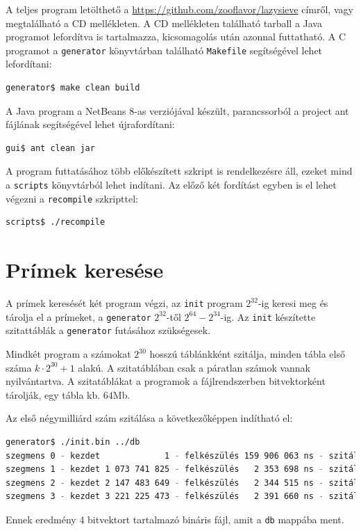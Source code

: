 A teljes program letölthető a \url{https://github.com/zooflavor/lazysieve} címről, vagy megtalálható a CD mellékleten.
A CD mellékleten található tarball a Java programot lefordítva is tartalmazza, kicsomagolás után azonnal futtatható.
A C programot a \texttt{generator} könyvtárban található \texttt{Makefile} segítségével lehet lefordítani:
\begin{lstlisting}[language=bash]
generator$ make clean build
\end{lstlisting}

A Java program a NetBeans 8-as verziójával készült,
parancssorból a project ant fájlának segítségével lehet újrafordítani:
\begin{lstlisting}[language=bash]
gui$ ant clean jar
\end{lstlisting}

A program futtatásához több előkészített szkript is rendelkezésre áll, ezeket mind a \texttt{scripts} könyvtárból lehet indítani.
Az előző két fordítást egyben is el lehet végezni a \texttt{recompile} szkripttel:
\begin{lstlisting}[language=bash]
scripts$ ./recompile
\end{lstlisting}

\section{Prímek keresése}

A prímek keresését két program végzi, az \texttt{init} program $2^{32}$-ig keresi meg és tárolja el a prímeket, a \texttt{generator} $2^{32}$-től $2^{64}-2^{34}$-ig.
Az \texttt{init} készítette szitattáblák a \texttt{generator} futásához szükségesek.

Mindkét program a számokat $2^{30}$ hosszú táblánkként szitálja, minden tábla első száma $k \cdot 2^{30}+1$ alakú.
A szitatáblában csak a páratlan számok vannak nyilvántartva.
A szitatáblákat a programok a fájlrendszerben bitvektorként tárolják, egy tábla kb. $64$Mb.

Az első négymilliárd szám szitálása a következőképpen indítható el:

\begin{lstlisting}[language=bash]
generator$ ./init.bin ../db
szegmens 0 - kezdet             1 - felkészülés 159 906 063 ns - szitálás 1 122 878 403 ns
szegmens 1 - kezdet 1 073 741 825 - felkészülés   2 353 698 ns - szitálás 1 171 101 336 ns
szegmens 2 - kezdet 2 147 483 649 - felkészülés   2 344 515 ns - szitálás 1 188 330 478 ns
szegmens 3 - kezdet 3 221 225 473 - felkészülés   2 391 660 ns - szitálás 1 199 900 603 ns
\end{lstlisting}
Ennek eredmény 4 bitvektort tartalmazó bináris fájl, amit a \texttt{db} mappába ment.

